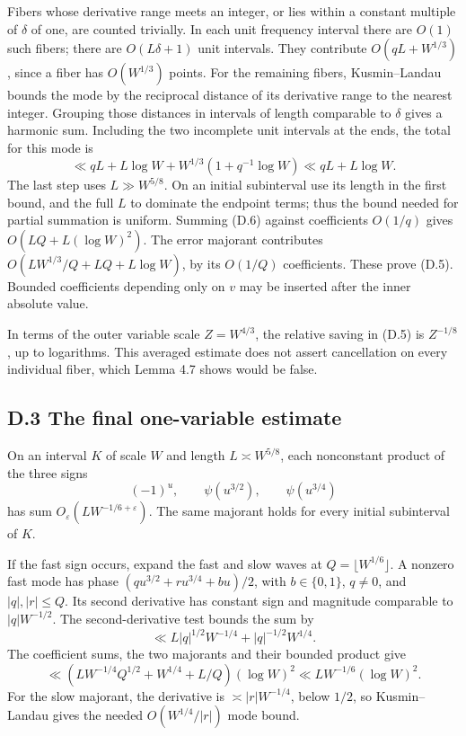 \documentclass[11pt,a4paper]{article}
\begin{document}
Fibers whose derivative range meets an integer, or lies within a
constant multiple of \(\delta\) of one, are counted trivially. In each
unit frequency interval there are \(O(1)\) such fibers; there are
\(O(L\delta+1)\) unit intervals. They contribute \(O(qL+W^{1/3})\),
since a fiber has \(O(W^{1/3})\) points. For the remaining fibers,
Kusmin--Landau bounds the mode by the reciprocal distance of its
derivative range to the nearest integer. Grouping those distances in
intervals of length comparable to \(\delta\) gives a harmonic sum.
Including the two incomplete unit intervals at the ends, the total for
this mode is \[
\ll qL+L\log W+W^{1/3}(1+q^{-1}\log W)
 \ll qL+L\log W.
\tag{D.6}
\] The last step uses \(L\gg W^{5/8}\). On an initial subinterval use
its length in the first bound, and the full \(L\) to dominate the
endpoint terms; thus the bound needed for partial summation is uniform.
Summing (D.6) against coefficients \(O(1/q)\) gives
\(O(LQ+L(\log W)^2)\). The error majorant contributes
\(O(LW^{1/3}/Q+LQ+L\log W)\), by its \(O(1/Q)\) coefficients. These
prove (D.5). Bounded coefficients depending only on \(v\) may be
inserted after the inner absolute value.

In terms of the outer variable scale \(Z=W^{4/3}\), the relative saving
in (D.5) is \(Z^{-1/8}\), up to logarithms. This averaged estimate does
not assert cancellation on every individual fiber, which Lemma 4.7 shows
would be false.

\subsection{D.3 The final one-variable
estimate}\label{d.3-the-final-one-variable-estimate}

On an interval \(K\) of scale \(W\) and length \(L\asymp W^{5/8}\), each
nonconstant product of the three signs \[
(-1)^u,\qquad \psi(u^{3/2}),\qquad \psi(u^{3/4})
\] has sum \(O_\varepsilon(LW^{-1/6+\varepsilon})\). The same majorant
holds for every initial subinterval of \(K\).

If the fast sign occurs, expand the fast and slow waves at
\(Q=\lfloor W^{1/6}\rfloor\). A nonzero fast mode has phase
\((q u^{3/2}+r u^{3/4}+bu)/2\), with \(b\in\{0,1\}\), \(q\ne0\), and
\(|q|,|r|\le Q\). Its second derivative has constant sign and magnitude
comparable to \(|q|W^{-1/2}\). The second-derivative test bounds the sum
by \[
\ll L|q|^{1/2}W^{-1/4}+|q|^{-1/2}W^{1/4}.
\] The coefficient sums, the two majorants and their bounded product
give \[
\ll (LW^{-1/4}Q^{1/2}+W^{1/4}+L/Q)(\log W)^2
 \ll LW^{-1/6}(\log W)^2.
\] For the slow majorant, the derivative is \(\asymp |r|W^{-1/4}\),
below \(1/2\), so Kusmin--Landau gives the needed \(O(W^{1/4}/|r|)\)
mode bound.
\end{document}
